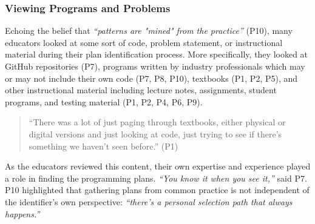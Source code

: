 
\subsubsection{Viewing Programs and Problems}
\label{sec:viewing-programs}
Echoing the belief that \textit{``patterns are "mined" from the practice''} (P10), many educators looked at some sort of code, problem statement, or instructional material during their plan identification process. More specifically, they looked at GitHub repositories (P7), programs written by industry professionals which may or may not include their own code (P7, P8, P10), textbooks (P1, P2, P5), and other instructional material including lecture notes, assignments, student programs, and testing material (P1, P2, P4, P6, P9).

\begin{quote}
``There was a lot of just paging through textbooks, either physical or digital versions and just looking at code, just trying to see if there's something we haven't seen before.'' (P1)
\end{quote}


As the educators reviewed this content, their own expertise and experience played a role in finding the programming plans. \textit{``You know it when you see it,''}  said P7. P10 highlighted that gathering plans from common practice is not independent of the identifier's own perspective: \textit{``there's a personal selection path that always happens.''} 





